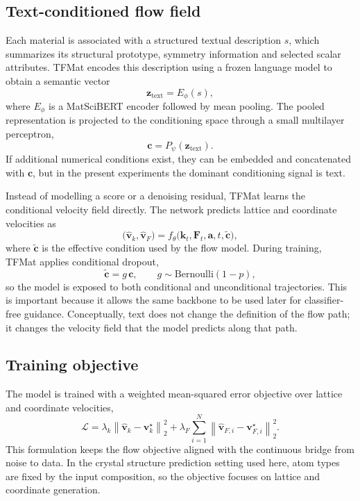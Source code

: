 \documentclass[fleqn,10pt]{wlscirep}
\begin{document}
\subsection*{Text-conditioned flow field}
Each material is associated with a structured textual description $s$, which summarizes its structural prototype, symmetry information and selected scalar attributes. TFMat encodes this description using a frozen language model to obtain a semantic vector
\begin{equation}
\mathbf{z}_{\mathrm{text}} = E_{\phi}(s),
\end{equation}
where $E_{\phi}$ is a MatSciBERT encoder followed by mean pooling. The pooled representation is projected to the conditioning space through a small multilayer perceptron,
\begin{equation}
\mathbf{c} = P_{\psi}(\mathbf{z}_{\mathrm{text}}).
\end{equation}
If additional numerical conditions exist, they can be embedded and concatenated with $\mathbf{c}$, but in the present experiments the dominant conditioning signal is text.

Instead of modelling a score or a denoising residual, TFMat learns the conditional velocity field directly. The network predicts lattice and coordinate velocities as
\begin{equation}
\big(\hat{\mathbf{v}}_{k}, \hat{\mathbf{v}}_{F}\big)
= f_{\theta}\!\big(\mathbf{k}_t, \mathbf{F}_t, \mathbf{a}, t, \tilde{\mathbf{c}}\big),
\end{equation}
where $\tilde{\mathbf{c}}$ is the effective condition used by the flow model. During training, TFMat applies conditional dropout,
\begin{equation}
\tilde{\mathbf{c}} = g\,\mathbf{c},
\qquad
g \sim \mathrm{Bernoulli}(1-p),
\end{equation}
so the model is exposed to both conditional and unconditional trajectories. This is important because it allows the same backbone to be used later for classifier-free guidance. Conceptually, text does not change the definition of the flow path; it changes the velocity field that the model predicts along that path.

\subsection*{Training objective}
The model is trained with a weighted mean-squared error objective over lattice and coordinate velocities,
\begin{equation}
\mathcal{L} = \lambda_k \left\|\hat{\mathbf{v}}_{k} - \mathbf{v}_{k}^{\star}\right\|_2^2
+ \lambda_F \sum_{i=1}^{N} \left\|\hat{\mathbf{v}}_{F,i} - \mathbf{v}_{F,i}^{\star}\right\|_2^2.
\end{equation}
This formulation keeps the flow objective aligned with the continuous bridge from noise to data. In the crystal structure prediction setting used here, atom types are fixed by the input composition, so the objective focuses on lattice and coordinate generation.
\end{document}

